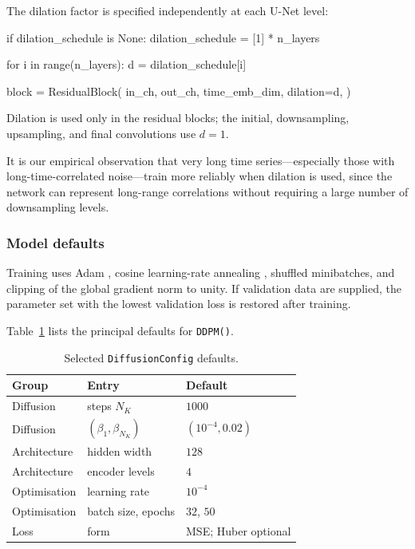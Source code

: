 The dilation factor is specified independently at each U-Net level:

\begin{pythonlisting}
if dilation_schedule is None:
    dilation_schedule = [1] * n_layers

for i in range(n_layers):
    d = dilation_schedule[i]

    block = ResidualBlock(
        in_ch,
        out_ch,
        time_emb_dim,
        dilation=d,
    )
\end{pythonlisting}

Dilation is used only in the residual blocks; the initial, downsampling, upsampling, and final convolutions use $d=1$.

It is our empirical observation that very long time series---especially those with long-time-correlated noise---train more reliably when dilation is used, since the network can represent long-range correlations without requiring a large number of downsampling levels.

\subsubsection{Model defaults}

Training uses Adam \cite{kingma2015adam}, cosine learning-rate annealing \cite{loshchilov2017sgdr}, shuffled minibatches, and clipping of the global gradient norm to unity. If validation data are supplied, the parameter set with the lowest validation loss is restored after training.

Table~\ref{tab:config} lists the principal defaults for \texttt{DDPM()}.

\begin{table}[t]
    \centering
    \caption{Selected \texttt{DiffusionConfig} defaults.}
    \label{tab:config}
    \small
    \begin{tabular}{@{}lll@{}}
        \toprule
        Group & Entry & Default \\
        \midrule
        Diffusion & steps $N_K$ & $1000$ \\
        Diffusion & $(\beta_1,\beta_{N_K})$ & $(10^{-4},0.02)$ \\
        Architecture & hidden width & $128$ \\
        Architecture & encoder levels & $4$ \\
        Optimisation & learning rate & $10^{-4}$ \\
        Optimisation & batch size, epochs & $32$, $50$ \\
        Loss & form & MSE; Huber optional \\
        \bottomrule
    \end{tabular}
\end{table}

